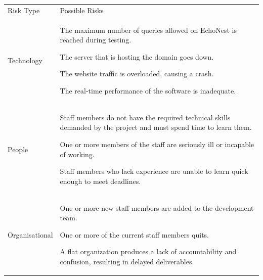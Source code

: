 \documentclass[]{article}
\begin{document}
\begin{longtable}[c]{@{}ll@{}}
\toprule\addlinespace
\begin{minipage}[t]{0.47\columnwidth}\raggedright
Risk Type
\end{minipage} & \begin{minipage}[t]{0.47\columnwidth}\raggedright
Possible Risks
\end{minipage}
\\\addlinespace
\begin{minipage}[t]{0.47\columnwidth}\raggedright
Technology
\end{minipage} & \begin{minipage}[t]{0.47\columnwidth}\raggedright
The maximum number of queries allowed on EchoNest is reached during
testing.

The server that is hosting the domain goes down.

The website traffic is overloaded, causing a crash.

The real-time performance of the software is inadequate.
\end{minipage}
\\\addlinespace
\begin{minipage}[t]{0.47\columnwidth}\raggedright
People
\end{minipage} & \begin{minipage}[t]{0.47\columnwidth}\raggedright
Staff members do not have the required technical skills demanded by the
project and must spend time to learn them.

One or more members of the staff are seriously ill or incapable of
working.

Staff members who lack experience are unable to learn quick enough to
meet deadlines.
\end{minipage}
\\\addlinespace
\begin{minipage}[t]{0.47\columnwidth}\raggedright
Organisational
\end{minipage} & \begin{minipage}[t]{0.47\columnwidth}\raggedright
One or more new staff members are added to the development team.

One or more of the current staff members quits.

A flat organization produces a lack of accountability and confusion,
resulting in delayed deliverables.


\end{minipage}
\end{longtable}
\end{document}
